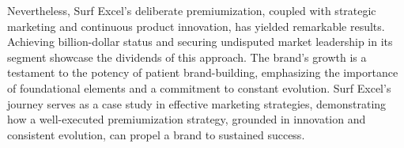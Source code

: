 Nevertheless, Surf Excel's deliberate premiumization, coupled with strategic marketing and continuous product innovation, has yielded remarkable results. Achieving billion-dollar status and securing undisputed market leadership in its segment showcase the dividends of this approach. The brand's growth is a testament to the potency of patient brand-building, emphasizing the importance of foundational elements and a commitment to constant evolution. Surf Excel's journey serves as a case study in effective marketing strategies, demonstrating how a well-executed premiumization strategy, grounded in innovation and consistent evolution, can propel a brand to sustained success.